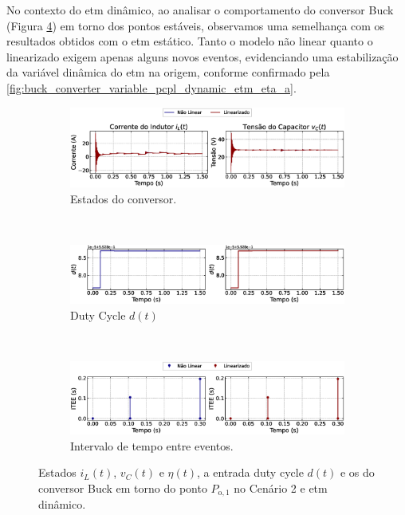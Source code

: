 No contexto do \acrshort{etm} dinâmico, ao analisar o comportamento do conversor Buck (Figura \ref{fig:buck_converter_variable_pcpl_dynamic_etm_op1}) em torno dos pontos estáveis, observamos uma semelhança com os resultados obtidos com o \acrshort{etm} estático. Tanto o modelo não linear quanto o linearizado exigem apenas alguns novos eventos, evidenciando uma estabilização da variável dinâmica do \acrshort{etm} na origem, conforme confirmado pela \autoref{fig:buck_converter_variable_pcpl_dynamic_etm_eta_a}.

\begin{figure}[H]
  \centering
  \captionsetup{justification=centering}
  \begin{subfigure}{1.\textwidth}
    \centering
    \includegraphics[width=1.\textwidth]{figuras/dynamic-etm/buck/sim2/op1/result.eps}
    \caption{Estados do conversor.}
    \label{fig:buck_converter_variable_pcpl_dynamic_etm_op1_a}
  \end{subfigure}
  \\[6pt]
  \begin{subfigure}{1.\textwidth}
    \centering
    \includegraphics[width=1.\textwidth]{figuras/dynamic-etm/buck/sim2/op1/duty-cycle.eps}
    \caption{Duty Cycle $d(t)$}
    \label{fig:buck_converter_variable_pcpl_dynamic_etm_op1_b}
  \end{subfigure}
  \\[6pt]
  \begin{subfigure}{1.\textwidth}
    \centering
    \includegraphics[width=1.\textwidth]{figuras/dynamic-etm/buck/sim2/op1/inter-event-times.eps}
    \caption{Intervalo de tempo entre eventos.}
    \label{fig:buck_converter_variable_pcpl_dynamic_etm_op1_c}
  \end{subfigure}
  \caption{Estados $i_L(t)$, $v_C(t)$ e $\eta(t)$, a entrada duty cycle $d(t)$ e os  do conversor Buck em torno do ponto $P_{\mathrm{o}, 1}$ no Cenário 2 e \acrshort{etm} dinâmico.}
  \label{fig:buck_converter_variable_pcpl_dynamic_etm_op1}
\end{figure}

